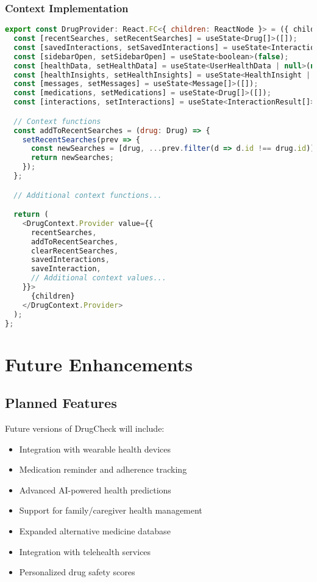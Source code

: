 \documentclass[12pt,a4paper]{report}
\begin{document}
\subsection{Context Implementation}
\begin{lstlisting}[language=JavaScript, caption=Drug Context Provider]
export const DrugProvider: React.FC<{ children: ReactNode }> = ({ children }) => {
  const [recentSearches, setRecentSearches] = useState<Drug[]>([]);
  const [savedInteractions, setSavedInteractions] = useState<InteractionResult[]>([]);
  const [sidebarOpen, setSidebarOpen] = useState<boolean>(false);
  const [healthData, setHealthData] = useState<UserHealthData | null>(null);
  const [healthInsights, setHealthInsights] = useState<HealthInsight | null>(null);
  const [messages, setMessages] = useState<Message[]>([]);
  const [medications, setMedications] = useState<Drug[]>([]);
  const [interactions, setInteractions] = useState<InteractionResult[]>([]);

  // Context functions
  const addToRecentSearches = (drug: Drug) => {
    setRecentSearches(prev => {
      const newSearches = [drug, ...prev.filter(d => d.id !== drug.id)].slice(0, 10);
      return newSearches;
    });
  };

  // Additional context functions...

  return (
    <DrugContext.Provider value={{
      recentSearches,
      addToRecentSearches,
      clearRecentSearches,
      savedInteractions,
      saveInteraction,
      // Additional context values...
    }}>
      {children}
    </DrugContext.Provider>
  );
};
\end{lstlisting}

\chapter{Future Enhancements}

\section{Planned Features}
Future versions of DrugCheck will include:
\begin{itemize}
    \item Integration with wearable health devices
    \item Medication reminder and adherence tracking
    \item Advanced AI-powered health predictions
    \item Support for family/caregiver health management
    \item Expanded alternative medicine database
    \item Integration with telehealth services
    \item Personalized drug safety scores
\end{itemize}
\end{document}
